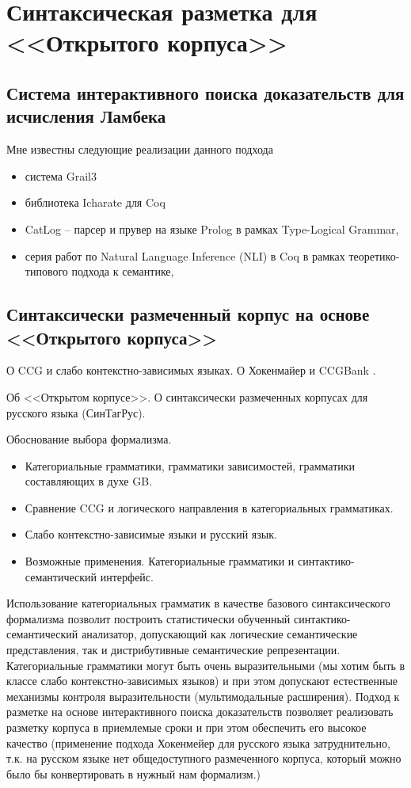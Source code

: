 \chapter{Синтаксическая разметка для <<Открытого корпуса>>}

\section{Система интерактивного поиска доказательств для исчисления Ламбека}

Мне известны следующие реализации данного подхода 
\begin{itemize}
	\item система Grail3 \parencite{moot2002proof} 
	\item библиотека Icharate для Coq \parencite{anoun2007approche}
	\item CatLog -- парсер и прувер на языке Prolog в рамках Type-Logical Grammar, \parencite{morrill2012catlog}
	\item серия работ по Natural Language Inference (NLI) в Coq в рамках теоретико-типового подхода к семантике, \parencite{chatzikyriakidis2014natural}
\end{itemize}

\section{Синтаксически размеченный корпус на основе <<Открытого корпуса>>}

О CCG и слабо контекстно-зависимых языках. О Хокенмайер и CCGBank \parencite{capelletti2009parsing}.


Об <<Открытом корпусе>>. О синтаксически размеченных корпусах для русского языка (СинТагРус).


Обоснование выбора формализма.

\begin{itemize}
    \item Категориальные грамматики, грамматики зависимостей, грамматики составляющих в духе GB. 
    \item Сравнение CCG и логического направления в категориальных грамматиках. 
    \item Слабо контекстно-зависимые языки и русский язык.
    \item Возможные применения. Категориальные грамматики и синтактико-семантический интерфейс. 
\end{itemize}


Использование категориальных грамматик в качестве базового синтаксического формализма позволит построить статистически обученный синтактико-семантический анализатор, допускающий как логические семантические представления, так и дистрибутивные семантические репрезентации. Категориальные грамматики могут быть очень выразительными (мы хотим быть в классе слабо контекстно-зависимых языков) и при этом допускают естественные механизмы контроля выразительности (мультимодальные расширения). Подход к разметке на основе интерактивного поиска доказательств позволяет реализовать разметку корпуса в приемлемые сроки и при этом обеспечить его высокое качество (применение подхода Хокенмейер для русского языка затруднительно, т.к. на русском языке нет общедоступного размеченного корпуса, который можно было бы конвертировать в нужный нам формализм.)